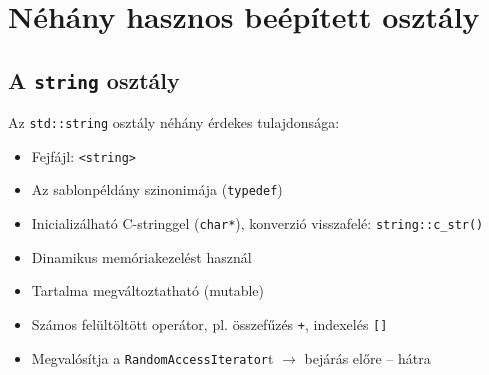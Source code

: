 \section{Néhány hasznos beépített osztály}

\subsection{A \texttt{string} osztály}

\begin{frame}
    Az \texttt{std::string} osztály néhány érdekes tulajdonsága:
    \begin{itemize}
        \item Fejfájl: \texttt{<string>}
        \item Az  sablonpéldány szinonimája (\texttt{typedef})
        \item Inicializálható C-stringgel (\texttt{char*}), konverzió visszafelé: \texttt{string::c\_str()}
        \item Dinamikus memóriakezelést használ
        \item Tartalma megváltoztatható (mutable)
        \item Számos felültöltött operátor, pl. összefűzés \texttt{+}, indexelés \texttt{[]}
        \item Megvalósítja a \texttt{RandomAccessIterator}t $\to$ bejárás előre -- hátra
    \end{itemize}
\end{frame}

\begin{frame}
    \begin{exampleblock}{}
        \scriptsize
        
        
    \end{exampleblock}
\end{frame}

